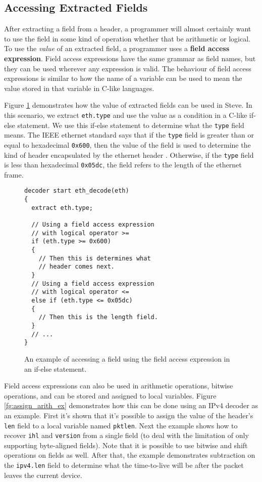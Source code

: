 \subsection{Accessing Extracted Fields} \label{decoder_access_tut}

After extracting a field from a header, a programmer will almost certainly want to use the field in some kind of operation whether that be arithmetic or logical. To use the \textit{value} of an extracted field, a programmer uses a \textbf{field access expression}. Field access expressions have the same grammar as field names, but they can be used wherever any expression is valid. The behaviour of field access expressions is similar to how the name of a variable can be used to mean the value stored in that variable in C-like languages.

Figure \ref{fg:access_ex} demonstrates how the value of extracted fields can be used in Steve. In this scenario, we extract \texttt{eth.type} and use the value as a condition in a C-like if-else statement. We use this if-else statement to determine what the \texttt{type} field means. The IEEE ethernet standard says that if the \texttt{type} field is greater than or equal to hexadecimal \texttt{0x600}, then the value of the field is used to determine the kind of header encapsulated by the ethernet header \cite{eth_std}. Otherwise, if the \texttt{type} field is less than hexadecimal \texttt{0x05dc}, the field refers to the length of the ethernet frame.

\begin{figure}
\begin{lstlisting}
decoder start eth_decode(eth)
{
  extract eth.type;
  
  // Using a field access expression 
  // with logical operator >=
  if (eth.type >= 0x600)
  {
    // Then this is determines what
    // header comes next.
  }
  // Using a field access expression 
  // with logical operator <=
  else if (eth.type <= 0x05dc)
  {
    // Then this is the length field.
  }
  // ...
}
\end{lstlisting}
\caption{An example of accessing a field using the field access expression in an if-else statement.}
\label{fg:access_ex}
\end{figure}

Field access expressions can also be used in arithmetic operations, bitwise operations, and can be stored and assigned to local variables. Figure \ref{fg:assign_arith_ex} demonstrates how this can be done using an IPv4 decoder as an example. First it's shown that it's possible to assign the value of the header's \texttt{len} field to a local variable named \texttt{pktlen}. Next the example shows how to recover \texttt{ihl} and \texttt{version} from a single field (to deal with the limitation of only supporting byte-aligned fields). Note that it is possible to use bitwise and shift operations on fields as well. After that, the example demonstrates subtraction on the \texttt{ipv4.len} field to determine what the time-to-live will be after the packet leaves the current device.

